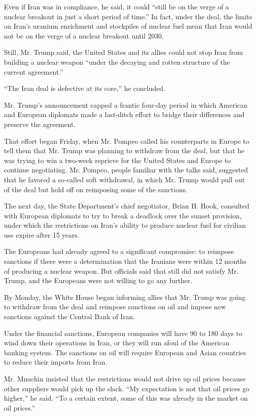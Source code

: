 Even if Iran was in compliance, he said, it could ``still be on the
verge of a nuclear breakout in just a short period of time.'' In fact,
under the deal, the limits on Iran's uranium enrichment and stockpiles
of nuclear fuel mean that Iran would not be on the verge of a nuclear
breakout until 2030.

Still, Mr. Trump said, the United States and its allies could not stop
Iran from building a nuclear weapon ``under the decaying and rotten
structure of the current agreement.''

``The Iran deal is defective at its core,'' he concluded.

Mr. Trump's announcement capped a frantic four-day period in which
American and European diplomats made a last-ditch effort to bridge their
differences and preserve the agreement.

That effort began Friday, when Mr. Pompeo called his counterparts in
Europe to tell them that Mr. Trump was planning to withdraw from the
deal, but that he was trying to win a two-week reprieve for the United
States and Europe to continue negotiating. Mr. Pompeo, people familiar
with the talks said, suggested that he favored a so-called soft
withdrawal, in which Mr. Trump would pull out of the deal but hold off
on reimposing some of the sanctions.

The next day, the State Department's chief negotiator, Brian H. Hook,
consulted with European diplomats to try to break a deadlock over the
sunset provision, under which the restrictions on Iran's ability to
produce nuclear fuel for civilian use expire after 15 years.

The Europeans had already agreed to a significant compromise: to
reimpose sanctions if there were a determination that the Iranians were
within 12 months of producing a nuclear weapon. But officials said that
still did not satisfy Mr. Trump, and the Europeans were not willing to
go any further.

By Monday, the White House began informing allies that Mr. Trump was
going to withdraw from the deal and reimpose sanctions on oil and impose
new sanctions against the Central Bank of Iran.

Under the financial sanctions, European companies will have 90 to 180
days to wind down their operations in Iran, or they will run afoul of
the American banking system. The sanctions on oil will require European
and Asian countries to reduce their imports from Iran.

Mr. Mnuchin insisted that the restrictions would not drive up oil prices
because other suppliers would pick up the slack. ``My expectation is not
that oil prices go higher,'' he said. ``To a certain extent, some of
this was already in the market on oil prices.''

